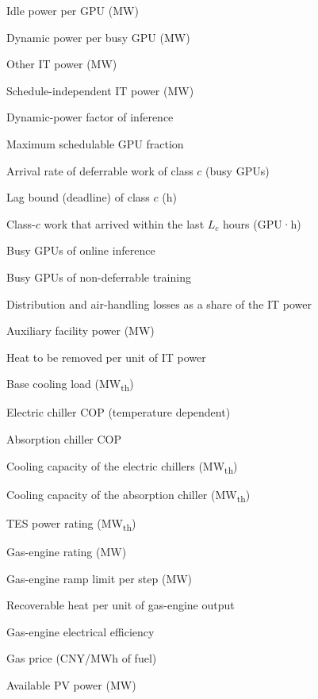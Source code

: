 \documentclass[a4paper,twocolumn,fleqn,10pt]{article}
\begin{document}
{\begin{nomlist}
\item[{\(p^{idle}\)}] Idle power per GPU (MW)
\item[{\(p^{dyn}\)}] Dynamic power per busy GPU (MW)
\item[{\(P^{oth}\)}] Other IT power (MW)
\item[{\(P^{fix}\)}] Schedule-independent IT power (MW)
\item[{\(\kappa^{inf}\)}] Dynamic-power factor of inference
\item[{\(u^{max}\)}] Maximum schedulable GPU fraction
\item[{\(a_{c,t}\)}] Arrival rate of deferrable work of class \(c\) (busy GPUs)
\item[{\(L_c\)}] Lag bound (deadline) of class \(c\) (h)
\item[{\(\bar B_{c,t}(L_c)\)}] Class-\(c\) work that arrived within the last \(L_c\) hours (GPU·h)
\item[{\(G^{inf}_t\)}] Busy GPUs of online inference
\item[{\(G^{fix}_t\)}] Busy GPUs of non-deferrable training
\item[{\(\zeta\)}] Distribution and air-handling losses as a share of the IT power
\item[{\(P^{aux}\)}] Auxiliary facility power (MW)
\item[{\(\theta\)}] Heat to be removed per unit of IT power
\item[{\(Q_0\)}] Base cooling load (MW\textsubscript{th})
\item[{\(\mathrm{COP}_t\)}] Electric chiller COP (temperature dependent)
\item[{\(\mathrm{COP}^{AC}\)}] Absorption chiller COP
\item[{\(\bar Q^{EC}\)}] Cooling capacity of the electric chillers (MW\textsubscript{th})
\item[{\(\bar Q^{AC}\)}] Cooling capacity of the absorption chiller (MW\textsubscript{th})
\item[{\(\bar Q^{T}\)}] TES power rating (MW\textsubscript{th})
\item[{\(\bar P^{GT}\)}] Gas-engine rating (MW)
\item[{\(R^{GT}\)}] Gas-engine ramp limit per step (MW)
\item[{\(k^h\)}] Recoverable heat per unit of gas-engine output
\item[{\(\eta^{GT}\)}] Gas-engine electrical efficiency
\item[{\(c^{gas}\)}] Gas price (CNY/MWh of fuel)
\item[{\(\bar P^{PV}_t\)}] Available PV power (MW)

\end{nomlist}}
\end{document}
